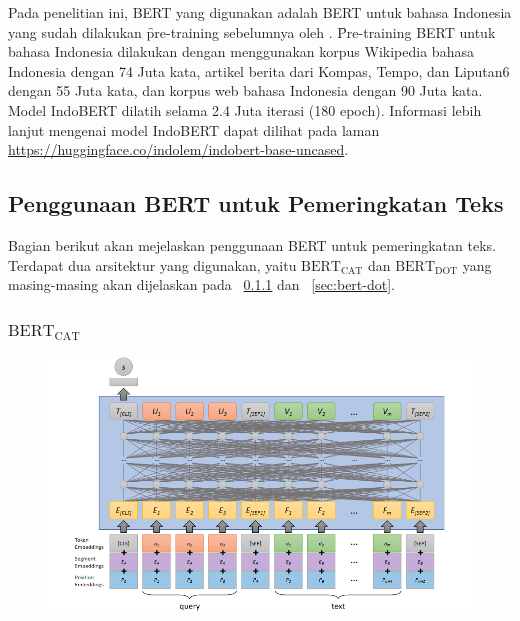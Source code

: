 	Pada penelitian ini, BERT yang digunakan adalah BERT untuk bahasa Indonesia yang sudah dilakukan \f{pre-training} sebelumnya oleh \cite{indobert}. \f{Pre-training} BERT untuk bahasa Indonesia dilakukan dengan menggunakan korpus Wikipedia bahasa Indonesia dengan 74 Juta kata, artikel berita dari Kompas, Tempo, dan Liputan6 dengan 55 Juta kata, dan korpus web bahasa Indonesia dengan 90 Juta kata. Model IndoBERT dilatih selama 2.4 Juta iterasi (180 epoch). Informasi lebih lanjut mengenai model IndoBERT dapat dilihat pada laman \url{https://huggingface.co/indolem/indobert-base-uncased}.


	\subsection{Penggunaan BERT untuk Pemeringkatan Teks}
	Bagian berikut akan mejelaskan penggunaan BERT untuk pemeringkatan teks. Terdapat dua arsitektur yang digunakan, yaitu $\text{BERT}_{\text{CAT}}$ dan $\text{BERT}_{\text{DOT}}$ yang masing-masing akan dijelaskan pada \sect~\ref{sec:bert-cat} dan \sect~\ref{sec:bert-dot}.

	\subsubsection{$\text{BERT}_{\text{CAT}}$}
		\label{sec:bert-cat}

		\begin{figure}
			\centering
			\includegraphics[width=1\textwidth]{assets/pics/bertcat.png}
			\label{fig:bert-cat}
		\end{figure}

